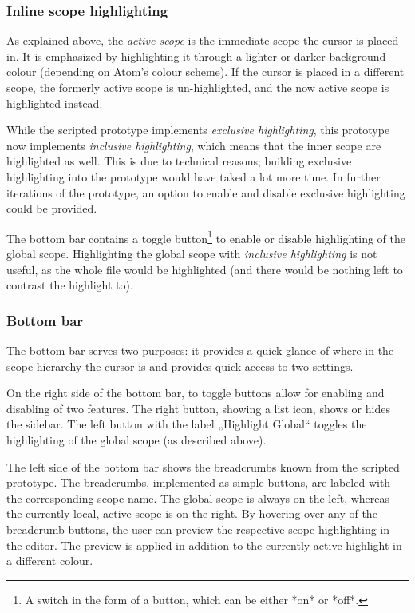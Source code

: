 \subsubsection{Inline scope
highlighting}\label{inline-scope-highlighting}

As explained above, the \emph{active scope} is the immediate scope the
cursor is placed in. It is emphasized by highlighting it through a
lighter or darker background colour (depending on Atom’s colour scheme).
If the cursor is placed in a different scope, the formerly active scope
is un-highlighted, and the now active scope is highlighted instead.

While the scripted prototype implements \emph{exclusive highlighting},
this prototype now implements \emph{inclusive highlighting}, which means
that the inner scope are highlighted as well. This is due to technical
reasons; building exclusive highlighting into the prototype would have
taked a lot more time. In further iterations of the prototype, an option
to enable and disable exclusive highlighting could be provided.

The bottom bar contains a toggle
button\footnote{A switch in the form of a button, which can be either *on* or *off*.}
to enable or disable highlighting of the global scope. Highlighting the
global scope with \emph{inclusive highlighting} is not useful, as the
whole file would be highlighted (and there would be nothing left to
contrast the highlight to).

\subsubsection{Bottom bar}\label{bottom-bar}

The bottom bar serves two purposes: it provides a quick glance of where
in the scope hierarchy the cursor is and provides quick access to two
settings.

On the right side of the bottom bar, to toggle buttons allow for
enabling and disabling of two features. The right button, showing a list
icon, shows or hides the sidebar. The left button with the label
„Highlight Global“ toggles the highlighting of the global scope (as
described above).

The left side of the bottom bar shows the breadcrumbs known from the
scripted prototype. The breadcrumbs, implemented as simple buttons, are
labeled with the corresponding scope name. The global scope is always on
the left, whereas the currently local, active scope is on the right. By
hovering over any of the breadcrumb buttons, the user can preview the
respective scope highlighting in the editor. The preview is applied in
addition to the currently active highlight in a different colour.

